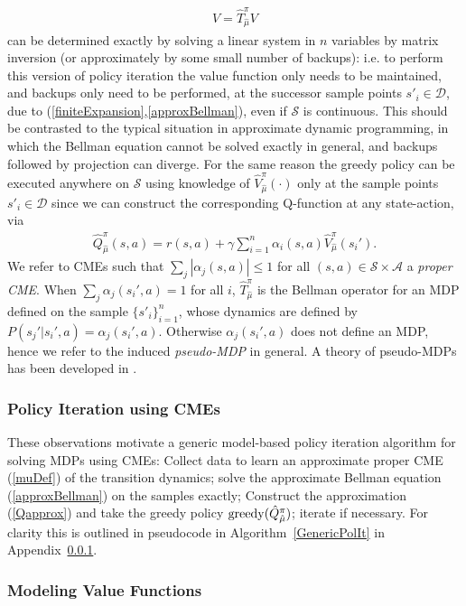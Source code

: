 \documentclass[letterpaper]{article}
\newcommand{\CsabaFLAM}{DBLP:conf/adprl/YaoSPZ14}
\newcommand{\cD}{{\mathcal D}}
\newcommand{\cA}{{\mathcal A}}
\newcommand{\cS}{{\mathcal S}}
\newcommand{\greedy}{\operatornamewithlimits{greedy}}
\begin{document}
\begin{align}
V =  \hat T^\pi_{\hat \mu} V \label{approxFP}
\end{align}
can be determined exactly by solving a linear system in $n$ variables by matrix inversion (or approximately by some small number of backups): i.e. to perform this version of policy iteration the value function only needs to be maintained, and backups only need to be performed, at the successor sample points $s'_i\in\cD$, due to (\ref{finiteExpansion},\ref{approxBellman}), even if $\cS$ is continuous. This should be contrasted to the typical situation in approximate dynamic programming, in which the Bellman equation cannot be solved exactly in general, and backups followed by projection can diverge. For the same reason the greedy policy can be executed anywhere on $\cS$ using knowledge of $\hat V_{\hat \mu}^{\pi}(\cdot)$ only at the sample points $s'_i\in\cD$ since we can construct the corresponding Q-function at any state-action, via
\begin{align}
\hat Q_{\hat \mu}^{\pi}(s,a) = r(s,a) + \gamma \sum_{i=1}^n \alpha_i(s,a)\hat V_{\hat \mu}^{\pi}(s_i').\label{Qapprox}
\end{align}
We refer to CMEs such that $\sum_j |\alpha_j(s,a)| \le 1$ for all $(s,a)\in\cS\times\cA$ a \emph{proper CME}. When $\sum_j \alpha_j(s_i',a) = 1$ for all $i$, $\hat T^{\pi}_{\hat \mu}$ is the Bellman operator for an MDP defined on the sample $\{s'_i\}_{i=1}^n$, whose dynamics are defined by $P(s_j'|s_i',a) = \alpha_j(s_i',a)$. Otherwise $\alpha_j(s_i',a)$ does not define an MDP, hence we refer to the induced \emph{pseudo-MDP} in general. A theory of pseudo-MDPs has been developed in \cite{\CsabaFLAM}.

\subsubsection{Policy Iteration using CMEs} \label{GenericAlg}

These observations motivate a generic model-based policy iteration algorithm for solving MDPs using CMEs: Collect data to learn an approximate proper CME (\ref{muDef}) of the transition dynamics; solve the approximate Bellman equation (\ref{approxBellman}) on the samples exactly; Construct the approximation (\ref{Qapprox}) and take the greedy policy $\greedy(\hat Q_{\hat \mu}^{\pi})$; iterate if necessary. For clarity this is outlined in pseudocode in Algorithm~\ref{GenericPolIt} in Appendix~\ref{GenericAlg}.

\subsubsection{Modeling Value Functions}
\end{document}
